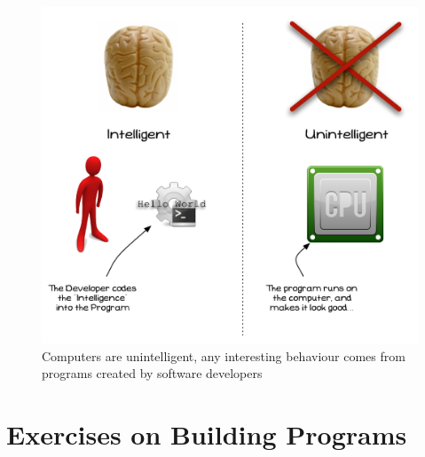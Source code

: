 \begin{figure}[h]
   \centering
   \includegraphics[width=\textwidth]{./topics/programs-and-compilers/diagrams/ProgramIntelligence} 
   \caption{Computers are unintelligent, any interesting behaviour comes from programs created by software developers}
   \label{fig:program-intelligence}
\end{figure}


\clearpage
\section{Exercises on Building Programs} %
\label{sec:examples_and_exercises_on_building_programs}

